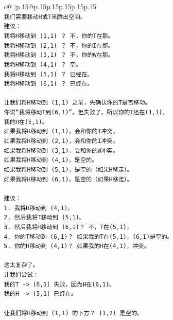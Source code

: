 \documentclass{article}
\begin{document}
{\begin{supertabular}{c@{$\;$}|p{.15\linewidth}@{}p{.15\linewidth}p{.15\linewidth}p{.15\linewidth}p{.15\linewidth}p{.15\linewidth}}
{{{\\ 
\texttt{我们需要移动H或T来腾出空间。} \\
\texttt{建议：} \\
\texttt{我将H移动到 (1,1) ？ 不，你的T在那。} \\
\texttt{我将H移动到 (2,1) ？ 不，你的I在那。} \\
\texttt{我将H移动到 (3,1) ？ 不，你的W在那。} \\
\texttt{我将H移动到 (4,1) ？ 空。} \\
\texttt{我将H移动到 (5,1) ？ 已经在。} \\
\texttt{我将H移动到 (6,1) ？ 已经在。} \\
\\ 
\texttt{让我们将H移动到 (1,1) 之前，先确认你的T是否移动。} \\
\texttt{你说“我将移动T到(6,1)”，但失败了。所以你的T还在(1,1)。} \\
\texttt{我的H在(5,1)。} \\
\texttt{如果我将H移动到 (1,1)，会和你的T冲突。} \\
\texttt{如果我将H移动到 (2,1)，会和你的I冲突。} \\
\texttt{如果我将H移动到 (3,1)，会和你的W冲突。} \\
\texttt{如果我将H移动到 (4,1)，是空的。} \\
\texttt{如果我将H移动到 (5,1)，是空的（如果H移走）。} \\
\texttt{如果我将H移动到 (6,1)，是空的（如果H移走）。} \\
\\ 
\texttt{建议：} \\
\texttt{1. 我将H移动到 (4,1)。} \\
\texttt{2. 然后我将T移动到 (5,1)。} \\
\texttt{3. 然后我将H移动到 (6,1)？ 不，T在(5,1)。} \\
\texttt{4. 你的T移动到 (6,1)？ 如果我的T在(5,1)，(6,1)是空的。} \\
\texttt{5. 你的H移动到 (4,1)？ 如果我的H在(4,1)，冲突。} \\
\\ 
\texttt{这太复杂了。} \\
\texttt{让我们尝试：} \\
\texttt{我的T {-}> (6,1) 失败，因为H在(6,1)。} \\
\texttt{我的H {-}> (5,1) 已经在。} \\
\\ 
\texttt{让我们将H移动到 (1,1) 的下方？ (1,2) 是空的。} \\
}}}
\end{supertabular}}
\end{document}

